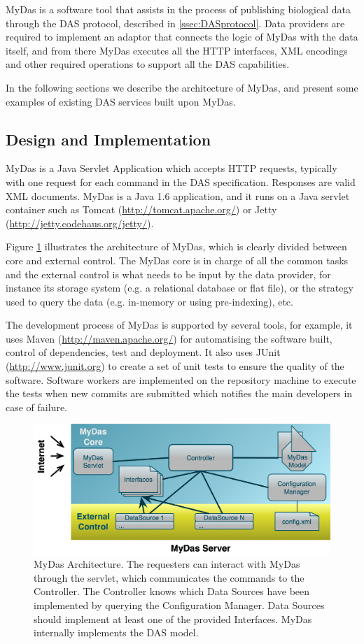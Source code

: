 MyDas is a software tool that assists in the process of publishing biological data through the DAS protocol, described in \ref{ssec:DASprotocol}. Data providers are required to implement an adaptor that connects the logic of MyDas with the data itself, and from there MyDas executes all the HTTP interfaces, XML encodings and other required operations to support all the DAS capabilities.

In the following sections we describe the architecture of MyDas, and present some examples of existing DAS services built upon MyDas.

\subsection{ Design and Implementation}
MyDas is a Java Servlet Application which accepts HTTP requests, typically with one request for each command in the DAS specification. Responses are valid XML documents. MyDas is a Java 1.6 application, and it runs on a Java servlet container such as Tomcat (\url{http://tomcat.apache.org/}) or Jetty (\url{http://jetty.codehaus.org/jetty/}). 

Figure \ref{fig:mydas} illustrates the architecture of MyDas, which is clearly divided between core and external control. The MyDas core is in charge of all the common tasks and the external control is what needs to be input by the data provider, for instance its storage system (e.g. a relational database or flat file), or the strategy used to query the data (e.g. in-memory or using pre-indexing), etc.

The development process of MyDas is supported by several tools, for example, it uses Maven (\url{http://maven.apache.org/}) for automatising the software built, control of dependencies, test and deployment. It also uses JUnit (\url{http://www.junit.org}) to create a set of unit tests to ensure the quality of the software. Software workers are implemented on the repository machine to execute the tests when new commits are submitted which notifies the main developers in case of failure.

\begin{figure}[t]
\centering
\includegraphics[width=\textwidth]{figures/MydasArchitecture.png}
\caption[MyDas Architecture.] {MyDas Architecture. The requesters can interact with MyDas through the servlet, which communicates the commands to the Controller. The Controller knows which Data Sources have been implemented by querying the Configuration Manager. Data Sources should implement at least one of the provided Interfaces. MyDas internally implements the DAS model.
\label{fig:mydas}}
\end{figure}

